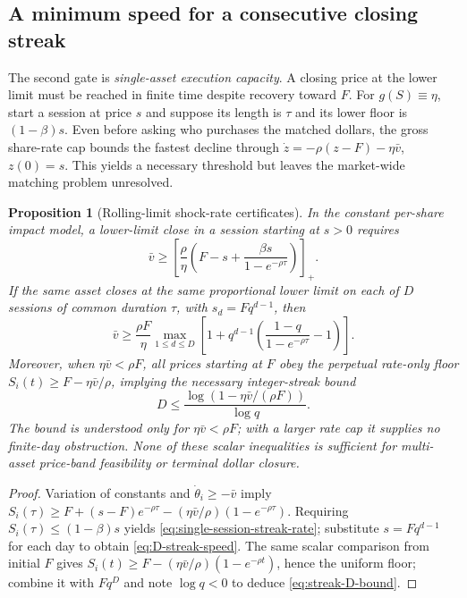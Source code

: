 \documentclass[11pt]{article}
\numberwithin{equation}{section}
\newtheorem{proposition}[theorem]{Proposition}
\theoremstyle{definition}
\theoremstyle{remark}
\begin{document}
\subsection{A minimum speed for a consecutive closing streak}\label{subsec:multiday-rate}
The second gate is \emph{single-asset execution capacity}. A closing price at the lower limit must be reached in finite time despite recovery toward $F$. For $g(S)\equiv\eta$, start a session at price $s$ and suppose its length is $\tau$ and its lower floor is $(1-\beta)s$. Even before asking who purchases the matched dollars, the gross share-rate cap bounds the fastest decline through $\dot z=-\rho(z-F)-\eta\bar v$, $z(0)=s$. This yields a necessary threshold but leaves the market-wide matching problem unresolved.
\begin{proposition}[Rolling-limit shock-rate certificates]\label{prop:rolling-rate}
In the constant per-share impact model, a lower-limit close in a session starting at $s>0$ requires
\begin{equation}\label{eq:single-session-streak-rate}
 \boxed{\quad\bar v\ge \left[\frac{\rho}{\eta}\left(F-s+
 \frac{\beta s}{1-e^{-\rho\tau}}\right)\right]_+.\quad}
\end{equation}
If the same asset closes at the same proportional lower limit on each of $D$ sessions of common duration $\tau$, with $s_d=Fq^{d-1}$, then
\begin{equation}\label{eq:D-streak-speed}
\boxed{\quad\bar v\ge\frac{\rho F}{\eta}\max_{1\le d\le D}
 \left[1+q^{d-1}\left(\frac{1-q}{1-e^{-\rho\tau}}-1\right)\right].\quad}
\end{equation}
Moreover, when $\eta\bar v<\rho F$, all prices starting at $F$ obey the perpetual \emph{rate-only} floor $S_i(t)\ge F-\eta\bar v/\rho$, implying the necessary integer-streak bound
\begin{equation}\label{eq:streak-D-bound}
\boxed{\quad D\le\frac{\log(1-\eta\bar v/(\rho F))}{\log q}.\quad}
\end{equation}
The bound is understood only for $\eta\bar v<\rho F$; with a larger rate cap it supplies no finite-day obstruction. None of these scalar inequalities is sufficient for multi-asset price-band feasibility or terminal dollar closure.
\end{proposition}
\begin{proof}
Variation of constants and $\dot\theta_i\ge-\bar v$ imply
$S_i(\tau)\ge F+(s-F)e^{-\rho\tau}-(\eta\bar v/\rho)(1-e^{-\rho\tau})$.
Requiring $S_i(\tau)\le(1-\beta)s$ yields \eqref{eq:single-session-streak-rate}; substitute $s=Fq^{d-1}$ for each day to obtain \eqref{eq:D-streak-speed}. The same scalar comparison from initial $F$ gives $S_i(t)\ge F-(\eta\bar v/\rho)(1-e^{-\rho t})$, hence the uniform floor; combine it with $Fq^D$ and note $\log q<0$ to deduce \eqref{eq:streak-D-bound}.
\end{proof}
\end{document}
